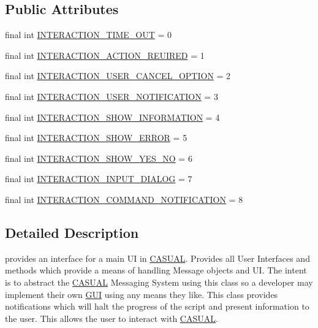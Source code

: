 \subsection*{Public Attributes}
\begin{DoxyCompactItemize}
\item 
final int \hyperlink{interface_c_a_s_u_a_l_1_1i_c_a_s_u_a_l_u_i_a1300f3c7c9d2856291cab7f83e5d250f}{I\-N\-T\-E\-R\-A\-C\-T\-I\-O\-N\-\_\-\-T\-I\-M\-E\-\_\-\-O\-U\-T} = 0
\item 
final int \hyperlink{interface_c_a_s_u_a_l_1_1i_c_a_s_u_a_l_u_i_aca28dc5825bdf86f02fbed58dca9a7a4}{I\-N\-T\-E\-R\-A\-C\-T\-I\-O\-N\-\_\-\-A\-C\-T\-I\-O\-N\-\_\-\-R\-E\-U\-I\-R\-E\-D} = 1
\item 
final int \hyperlink{interface_c_a_s_u_a_l_1_1i_c_a_s_u_a_l_u_i_acfd8f207fba42b0a192a88ab6184357a}{I\-N\-T\-E\-R\-A\-C\-T\-I\-O\-N\-\_\-\-U\-S\-E\-R\-\_\-\-C\-A\-N\-C\-E\-L\-\_\-\-O\-P\-T\-I\-O\-N} = 2
\item 
final int \hyperlink{interface_c_a_s_u_a_l_1_1i_c_a_s_u_a_l_u_i_a0ac4cd400b7dd01c7674fdb719956470}{I\-N\-T\-E\-R\-A\-C\-T\-I\-O\-N\-\_\-\-U\-S\-E\-R\-\_\-\-N\-O\-T\-I\-F\-I\-C\-A\-T\-I\-O\-N} = 3
\item 
final int \hyperlink{interface_c_a_s_u_a_l_1_1i_c_a_s_u_a_l_u_i_abd49e7ec0d06d1cf3ed35966a1353198}{I\-N\-T\-E\-R\-A\-C\-T\-I\-O\-N\-\_\-\-S\-H\-O\-W\-\_\-\-I\-N\-F\-O\-R\-M\-A\-T\-I\-O\-N} = 4
\item 
final int \hyperlink{interface_c_a_s_u_a_l_1_1i_c_a_s_u_a_l_u_i_a085238e30ca63987d64acbb37e76a80f}{I\-N\-T\-E\-R\-A\-C\-T\-I\-O\-N\-\_\-\-S\-H\-O\-W\-\_\-\-E\-R\-R\-O\-R} = 5
\item 
final int \hyperlink{interface_c_a_s_u_a_l_1_1i_c_a_s_u_a_l_u_i_ab14fbf025c12a1a217826aa8c0cae48e}{I\-N\-T\-E\-R\-A\-C\-T\-I\-O\-N\-\_\-\-S\-H\-O\-W\-\_\-\-Y\-E\-S\-\_\-\-N\-O} = 6
\item 
final int \hyperlink{interface_c_a_s_u_a_l_1_1i_c_a_s_u_a_l_u_i_a1f982ad877027f12d594a1e8fcf942f2}{I\-N\-T\-E\-R\-A\-C\-T\-I\-O\-N\-\_\-\-I\-N\-P\-U\-T\-\_\-\-D\-I\-A\-L\-O\-G} = 7
\item 
final int \hyperlink{interface_c_a_s_u_a_l_1_1i_c_a_s_u_a_l_u_i_a1344b8156e454e8861b736538aaa6b99}{I\-N\-T\-E\-R\-A\-C\-T\-I\-O\-N\-\_\-\-C\-O\-M\-M\-A\-N\-D\-\_\-\-N\-O\-T\-I\-F\-I\-C\-A\-T\-I\-O\-N} = 8
\end{DoxyCompactItemize}


\subsection{Detailed Description}
provides an interface for a main U\-I in \hyperlink{namespace_c_a_s_u_a_l}{C\-A\-S\-U\-A\-L}. Provides all User Interfaces and methods which provide a means of handling Message objects and U\-I. The intent is to abstract the \hyperlink{namespace_c_a_s_u_a_l}{C\-A\-S\-U\-A\-L} Messaging System using this class so a developer may implement their own \hyperlink{namespace_c_a_s_u_a_l_1_1_g_u_i}{G\-U\-I} using any means they like. This class provides notifications which will halt the progress of the script and present information to the user. This allows the user to interact with \hyperlink{namespace_c_a_s_u_a_l}{C\-A\-S\-U\-A\-L}.

